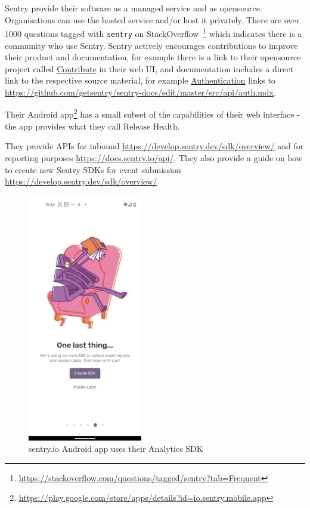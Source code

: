Sentry provide their software as a managed service and as opensource. Organisations can use the hosted service and/or host it privately. There are over 1000 questions tagged with \texttt{sentry} on StackOverflow~\footnote{\url{https://stackoverflow.com/questions/tagged/sentry?tab=Frequent}} which indicates there is a community who use Sentry. Sentry actively encourages contributions to improve their product and documentation, for example there is a link to their opensource project called \href{https://github.com/getsentry/sentry}{Contribute} in their web UI, and documentation includes a direct link to the respective source material, for example \href{https://docs.sentry.io/api/auth/}{Authentication} links to \url{https://github.com/getsentry/sentry-docs/edit/master/src/api/auth.mdx}.

Their Android app\footnote{\url{https://play.google.com/store/apps/details?id=io.sentry.mobile.app}} has a small subset of the capabilities of their web interface - the app provides what they call Release Health.

They provide APIs for inbound \url{https://develop.sentry.dev/sdk/overview/} and for reporting purposes \url{https://docs.sentry.io/api/}. They also provide a guide on how to create new Sentry SDKs for event submission \url{https://develop.sentry.dev/sdk/overview/}

\begin{figure}
    \centering
    \includegraphics[width=5cm]{images/sentry.io/Screenshot_20210914-192435.png}
    \caption{sentry.io Android app uses their Analytics SDK}
    \label{fig:sentry-io-analytics-sdk-opt-in}
\end{figure}

